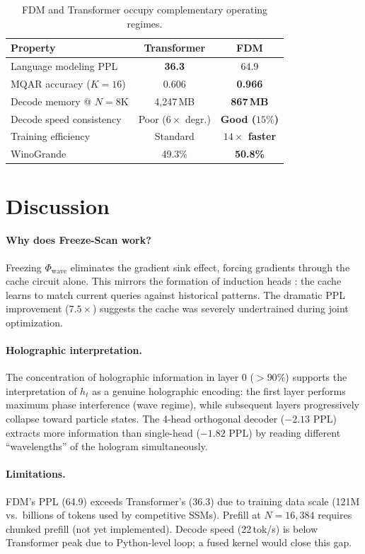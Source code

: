 \documentclass{article}
\begin{document}
\begin{table}[h]
\centering
\caption{FDM and Transformer occupy complementary operating regimes.}
\label{tab:comparison}
\begin{tabular}{lcc}
\toprule
Property & Transformer & FDM \\
\midrule
Language modeling PPL & \textbf{36.3} & 64.9 \\
MQAR accuracy ($K{=}16$) & 0.606 & \textbf{0.966} \\
Decode memory @ $N{=}8$K & 4,247\,MB & \textbf{867\,MB} \\
Decode speed consistency & Poor ($6\times$ degr.) & \textbf{Good ($15\%$)} \\
Training efficiency & Standard & \textbf{$14\times$ faster} \\
WinoGrande & 49.3\% & \textbf{50.8\%} \\
\bottomrule
\end{tabular}
\end{table}

\section{Discussion}

\paragraph{Why does Freeze-Scan work?}
Freezing $\Phi_\text{wave}$ eliminates the gradient sink effect,
forcing gradients through the cache circuit alone.
This mirrors the formation of induction heads \citep{olsson2022context}:
the cache learns to match current queries against historical patterns.
The dramatic PPL improvement ($7.5\times$) suggests the cache was
severely undertrained during joint optimization.

\paragraph{Holographic interpretation.}
The concentration of holographic information in layer 0 ($>90\%$)
supports the interpretation of $h_t$ as a genuine holographic encoding:
the first layer performs maximum phase interference (wave regime),
while subsequent layers progressively collapse toward particle states.
The 4-head orthogonal decoder ($-2.13$ PPL) extracts more information
than single-head ($-1.82$ PPL) by reading different ``wavelengths'' of
the hologram simultaneously.

\paragraph{Limitations.}
FDM's PPL (64.9) exceeds Transformer's (36.3) due to training data scale
(121M vs.\ billions of tokens used by competitive SSMs).
Prefill at $N{=}16{,}384$ requires chunked prefill (not yet implemented).
Decode speed (22\,tok/s) is below Transformer peak due to Python-level loop;
a fused kernel would close this gap.
\end{document}
